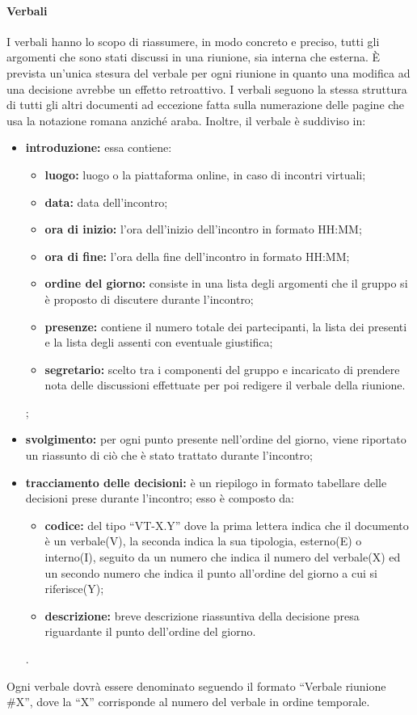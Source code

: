 			\paragraph{Verbali}
				I verbali hanno lo scopo di riassumere, in modo concreto e preciso, tutti gli argomenti che sono stati discussi in una riunione, sia interna che esterna. È prevista un'unica stesura del verbale per ogni riunione in quanto una modifica ad una decisione avrebbe un effetto retroattivo. I verbali seguono la stessa struttura di tutti gli altri documenti ad eccezione fatta sulla numerazione delle pagine che usa la notazione romana anziché araba. Inoltre, il verbale è suddiviso in:
				\begin{itemize}
					\item \textbf{introduzione:} essa contiene:
						\begin{itemize}
							\item \textbf{luogo:} luogo o la piattaforma online, in caso di incontri virtuali;
							\item \textbf{data:} data dell'incontro;
							\item \textbf{ora di inizio:} l'ora dell'inizio dell'incontro in formato HH:MM;
							\item \textbf{ora di fine:} l'ora della fine dell'incontro in formato HH:MM;
							\item \textbf{ordine del giorno:} consiste in una lista degli argomenti che il gruppo si è proposto di discutere durante l'incontro;
							\item \textbf{presenze:} contiene il numero totale dei partecipanti, la lista dei presenti e la lista degli assenti con eventuale giustifica;
							\item \textbf{segretario: } scelto tra i componenti del gruppo e incaricato di prendere nota delle discussioni effettuate per poi redigere il verbale della riunione.
						\end{itemize};
					\item \textbf{svolgimento:} per ogni punto presente nell'ordine del giorno, viene riportato un riassunto di ciò che è stato trattato durante l'incontro;
					\item \textbf{tracciamento delle decisioni:} è un riepilogo in formato tabellare delle decisioni prese durante l'incontro; esso è composto da:
						\begin{itemize}
							\item \textbf{codice:} del tipo ``VT-X.Y'' dove la prima lettera indica che il documento è un verbale(V), la seconda indica la sua tipologia, esterno(E) o interno(I), seguito da un numero che indica il numero del verbale(X) ed un secondo numero che indica il punto all'ordine del giorno a cui si riferisce(Y);
							\item \textbf{descrizione:} breve descrizione riassuntiva della decisione presa riguardante il punto dell'ordine del giorno.
					\end{itemize}.
				\end{itemize}
				Ogni verbale dovrà essere denominato seguendo il formato ``Verbale riunione \#X'', dove la ``X'' corrisponde al numero del verbale in ordine temporale.
